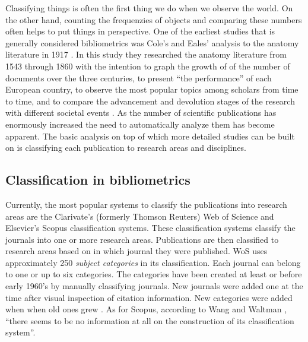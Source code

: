 Classifying things is often the first thing we do when we observe 
the world. On the other hand, counting the frequenzies of objects
and comparing these numbers often helps to put things in 
perspective.
One of the earliest studies that is generally considered
bibliometrics was Cole's and Eales' analysis to the anatomy 
literature in 1917 \cite{cole_history_1917}. In this study they 
researched the anatomy literature from 1543 through 1860 with the 
intention to graph the growth of of the number of documents over 
the three centuries, to present ``the performance'' of each 
European country, to observe the most popular topics among 
scholars from time to time, and to compare the advancement and 
devolution stages of the research with different societal 
events \cite{bellis_bibliometrics_2009}.
As the number of scientific publications has enormously increased
the need to automatically analyze them has become apparent.
The basic analysis on top of which more detailed studies can be 
built on is classifying each publication to research areas and
disciplines.


\subsection{Classification in bibliometrics}
Currently, the most popular systems to classify the publications 
into research areas are the Clarivate's (formerly Thomson Reuters)
Web of Science and Elsevier's Scopus classification
systems. These classification systems classify the journals into
one or more research areas. \cite{waltman_new_2012} Publications
are then classified to research areas based on in which journal they
were published. WoS uses approximately 250 \emph{subject categories}
in its classification. Each journal can belong 
to one or up to six categories. The categories have been created
at least or before early 1960's by manually classifying journals.
New journals were added one at the time after visual inspection of
citation information. New categories were added when when old ones
grew \cite{pudovkin_algorithmic_2002}. As for Scopus, according to 
Wang and Waltman \cite{wang_large-scale_2016}, ``there seems to be no 
information at all on the construction of its classification 
system''.

